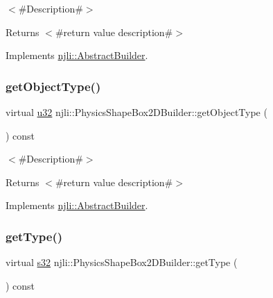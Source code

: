 $<$\#\+Description\#$>$

\begin{DoxyReturn}{Returns}
$<$\#return value description\#$>$ 
\end{DoxyReturn}


Implements \mbox{\hyperlink{classnjli_1_1_abstract_builder_a902f73ea78031b06aca183a417f3413b}{njli\+::\+Abstract\+Builder}}.

\mbox{\label{classnjli_1_1_physics_shape_box2_d_builder_a37233c16c737855c53c266dc61c38460}} 
\subsubsection{\texorpdfstring{get\+Object\+Type()}{getObjectType()}}
{\footnotesize\ttfamily virtual \mbox{\hyperlink{_util_8h_a10e94b422ef0c20dcdec20d31a1f5049}{u32}} njli\+::\+Physics\+Shape\+Box2\+D\+Builder\+::get\+Object\+Type (\begin{DoxyParamCaption}{ }\end{DoxyParamCaption}) const\hspace{0.3cm}{\ttfamily [virtual]}}

$<$\#\+Description\#$>$

\begin{DoxyReturn}{Returns}
$<$\#return value description\#$>$ 
\end{DoxyReturn}


Implements \mbox{\hyperlink{classnjli_1_1_abstract_builder_a0f2d344fcf697b167f4f2b1122b5fb33}{njli\+::\+Abstract\+Builder}}.

\mbox{\label{classnjli_1_1_physics_shape_box2_d_builder_a9a211fdd20d1a6f5f2dda97a1d8b6b0c}} 
\subsubsection{\texorpdfstring{get\+Type()}{getType()}}
{\footnotesize\ttfamily virtual \mbox{\hyperlink{_util_8h_aa62c75d314a0d1f37f79c4b73b2292e2}{s32}} njli\+::\+Physics\+Shape\+Box2\+D\+Builder\+::get\+Type (\begin{DoxyParamCaption}{ }\end{DoxyParamCaption}) const\hspace{0.3cm}{\ttfamily [virtual]}}

